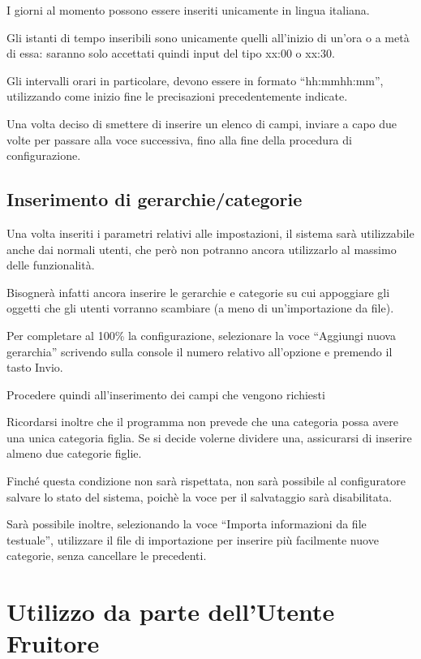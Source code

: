I giorni al momento possono essere inseriti unicamente in lingua italiana.

Gli istanti di tempo inseribili sono unicamente quelli all'inizio di un'ora o a metà di essa: saranno solo accettati quindi input del tipo xx:00 o xx:30.

Gli intervalli orari in particolare, devono essere in formato ``hh:mm\-hh:mm'', utilizzando come inizio fine le precisazioni precedentemente indicate.

Una volta deciso di smettere di inserire un elenco di campi, inviare a capo due volte per passare alla voce successiva, fino alla fine della procedura di configurazione.

\subsection{Inserimento di gerarchie/categorie}

Una volta inseriti i parametri relativi alle impostazioni, il sistema sarà utilizzabile anche dai normali utenti, che però non potranno ancora utilizzarlo al massimo delle funzionalità.

Bisognerà infatti ancora inserire le gerarchie e categorie su cui appoggiare gli oggetti che gli utenti vorranno scambiare (a meno di un'importazione da file).

Per completare al 100\% la configurazione, selezionare la voce ``Aggiungi nuova gerarchia'' scrivendo sulla console il numero relativo all'opzione e premendo il tasto Invio.

Procedere quindi all'inserimento dei campi che vengono richiesti 

Ricordarsi inoltre che il programma non prevede che una categoria possa avere una unica categoria figlia. Se si decide volerne dividere una, assicurarsi di inserire almeno due categorie figlie.

Finché questa condizione non sarà rispettata, non sarà possibile al configuratore salvare lo stato del sistema, poichè la voce per il salvataggio sarà disabilitata.

Sarà possibile inoltre, selezionando la voce ``Importa informazioni da file testuale'', utilizzare il file di importazione per inserire più facilmente nuove categorie, senza cancellare le precedenti.

\section{Utilizzo da parte dell'Utente Fruitore}

